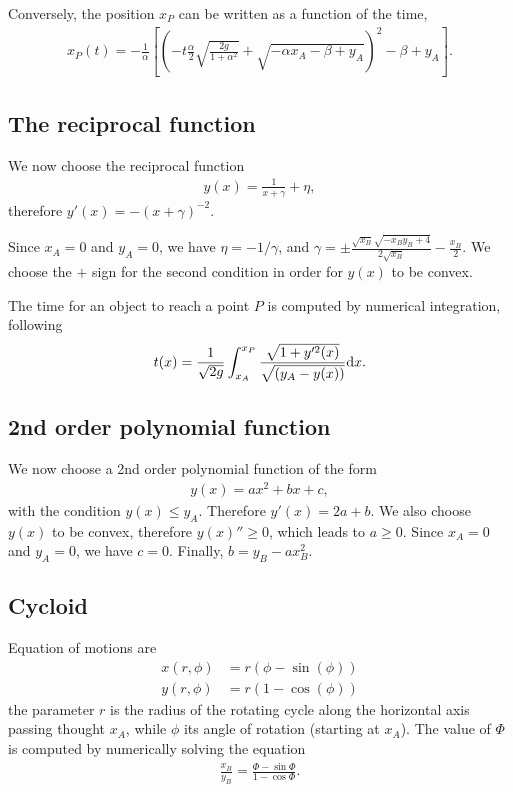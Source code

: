 \documentclass{article}
\begin{document}
Conversely, the position $x_P$ can be written as a function of the time,
\begin{align}
x_P(t) = -\frac 1 \alpha \left [ \left(- t \frac{\alpha}{2} \sqrt{\frac{2g}{1 + \alpha^2}} + \sqrt{-\alpha x_A- \beta + y_A}\right)^2 - \beta + y_A \right].
\end{align}

\subsection*{The reciprocal function}

We now choose the reciprocal function
\begin{align}
y(x) = \frac1{x+\gamma} + \eta,
\end{align}
therefore $y'(x) = -(x+\gamma)^{-2}$.

Since $x_A = 0$ and $y_A=0$, we have $\eta = -1/\gamma$, and $\displaystyle \gamma = \pm\frac{\sqrt{x_B} \sqrt{- x_B y_B + 4}}{2\sqrt{x_B}} - \frac{x_B}2$. We choose the $+$ sign for the second condition in order for $y(x)$ to be convex.

The time for an object to reach a point $P$ is computed by numerical integration, following
\begin{align}
t(x) &= \frac 1{\sqrt{2 g}} \int_{x_A}^{x_P} \frac{\sqrt{1 + y'^2(x)}}{\sqrt{(y_A - y(x))}} \text d x.\\
\label{eq:tAP_reciprocal}
\end{align}

\subsection*{2nd order polynomial function}

We now choose a 2nd order polynomial function of the form
\begin{align}
y(x) = a x^2 + b x + c,
\end{align}
with the condition $y(x) \leq y_A$. Therefore $y'(x) = 2a + b$. We also choose $y(x)$ to be convex, therefore $y(x)'' \geq 0$, which leads to $a \geq 0$. Since $x_A = 0$ and $y_A=0$, we have $c=0$. Finally, $b = y_B - a x_B^2$.


\subsection*{Cycloid}

Equation of motions are
\begin{align}
  x(r, \phi) &= r(\phi - \sin(\phi))\\
  y(r, \phi) &= r(1 - \cos(\phi))
\end{align}
the parameter $r$ is the radius of the rotating cycle along the horizontal axis passing thought $x_A$, while $\phi$ its angle of rotation (starting at $x_A$). The value of $\Phi$ is computed by numerically solving the equation
\begin{align}
  \frac{x_B}{y_B} = \frac{\Phi - \sin{\Phi}}{1 - \cos{\Phi}}.
\end{align}
\end{document}
